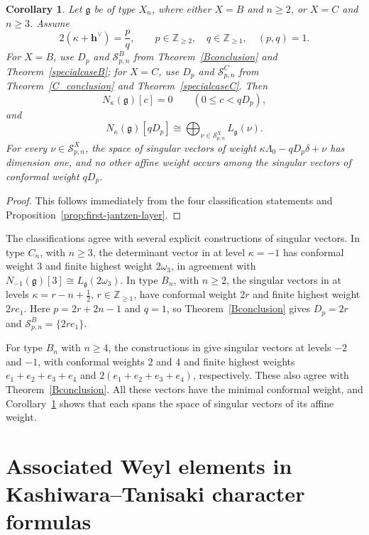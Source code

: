 \documentclass[11pt,a4paper]{amsart}
\newcommand{\ZZ}{\mathbb Z}
\theoremstyle{plain}
\newtheorem{cor}[theorem]{Corollary}
\numberwithin{equation}{section}
\newenvironment{pf}{\begin{proof}}{\end{proof}}
\begin{document}
\begin{cor}
\label{cor:BC-first-radical}
Let \(\mathfrak g\) be of type \(X_n\), where either \(X=B\) and
\(n\ge2\), or \(X=C\) and \(n\ge3\). Assume
\[
2(\kappa+\mathbf{h}^\vee)=\frac pq,
\qquad p\in\ZZ_{\ge2},\quad q\in\ZZ_{\ge1},\quad (p,q)=1.
\]
For \(X=B\), use \(D_p\) and \(\mathcal S^B_{p,n}\) from
Theorem~\ref{Bconclusion} and Theorem~\ref{specialcaseB};
for \(X=C\), use \(D_p\) and \(\mathcal S^C_{p,n}\) from
Theorem~\ref{C_conclusion} and Theorem~\ref{specialcaseC}. Then
\[
N_\kappa(\mathfrak g)[c]=0
\qquad(0\le c<qD_p),
\]
and
\[
N_\kappa(\mathfrak g)[qD_p]
\cong
\bigoplus_{\nu\in\mathcal S^X_{p,n}}L_{\mathfrak g}(\nu).
\]
For every \(\nu\in\mathcal S^X_{p,n}\), the space of singular
vectors of weight \(\kappa\Lambda_0-qD_p\delta+\nu\) has dimension
one, and no other affine weight occurs among the singular vectors
of conformal weight \(qD_p\).
\end{cor}
\begin{pf}
This follows immediately from the four classification statements and
Proposition~\ref{prop:first-jantzen-layer}.
\end{pf}

The classifications agree with several explicit constructions of
singular vectors. In type \(C_n\), with \(n\ge3\), the determinant
vector in \cite[Theorem~4.1]{Ad03} at level \(\kappa=-1\) has
conformal weight \(3\) and finite highest weight \(2\omega_3\),
in agreement with
\(N_{-1}(\mathfrak g)[3]\cong L_{\mathfrak g}(2\omega_3)\).
In type \(B_n\), with \(n\ge2\), the singular vectors in
\cite[Lemma~3.2]{Pe07} at levels \(\kappa=r-n+\tfrac12\),
\(r\in\ZZ_{\ge1}\), have conformal weight \(2r\) and finite
highest weight \(2re_1\). Here \(p=2r+2n-1\) and \(q=1\),
so Theorem~\ref{Bconclusion} gives \(D_p=2r\) and
\(\mathcal S^B_{p,n}=\{2re_1\}\).

For type \(B_n\) with \(n\ge4\), the constructions in
\cite[Theorem~4.2(2)(b)]{AM18} give singular vectors at levels
\(-2\) and \(-1\), with conformal weights \(2\) and \(4\)
and finite highest weights \(e_1+e_2+e_3+e_4\) and
\(2(e_1+e_2+e_3+e_4)\), respectively.
These also agree with Theorem~\ref{Bconclusion}.
All these vectors have the minimal conformal weight, and
Corollary~\ref{cor:BC-first-radical} shows that each spans the
space of singular vectors of its affine weight.

\raggedbottom

\section{Associated Weyl elements in Kashiwara--Tanisaki character formulas}
\label{sec:weyl}
\end{document}

